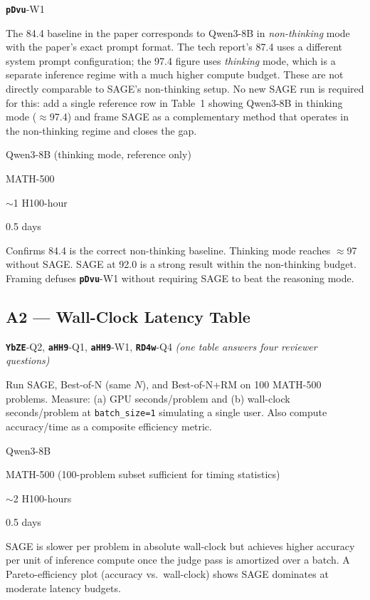 \documentclass[11pt,a4paper]{article}
\newcommand{\rev}[1]{\texttt{\textbf{#1}}}
\begin{document}
\begin{description}[leftmargin=2cm, style=nextline]
  \item[Covers] \rev{pDvu}-W1
  \item[Rationale] The 84.4 baseline in the paper corresponds to Qwen3-8B in \emph{non-thinking}
    mode with the paper's exact prompt format. The tech report's 87.4 uses a different system
    prompt configuration; the 97.4 figure uses \emph{thinking} mode, which is a separate inference
    regime with a much higher compute budget. These are not directly comparable to SAGE's
    non-thinking setup. No new SAGE run is required for this: add a single reference row in
    Table~1 showing Qwen3-8B in thinking mode ($\approx$97.4) and frame SAGE as a
    complementary method that operates in the non-thinking regime and closes the gap.
  \item[Model] Qwen3-8B (thinking mode, reference only)
  \item[Benchmark] MATH-500
  \item[GPU estimate] $\sim$1 H100-hour
  \item[Wall-clock] 0.5 days
  \item[Expected outcome] Confirms 84.4 is the correct non-thinking baseline. Thinking mode
    reaches $\approx$97 without SAGE. SAGE at 92.0 is a strong result within the non-thinking
    budget. Framing defuses \rev{pDvu}-W1 without requiring SAGE to beat the reasoning mode.
\end{description}

\subsection*{A2 --- Wall-Clock Latency Table}

\begin{description}[leftmargin=2cm, style=nextline]
  \item[Covers] \rev{YbZE}-Q2, \rev{aHH9}-Q1, \rev{aHH9}-W1, \rev{RD4w}-Q4
    \emph{(one table answers four reviewer questions)}
  \item[Procedure] Run SAGE, Best-of-N (same $N$), and Best-of-N+RM on 100 MATH-500 problems.
    Measure: (a) GPU seconds/problem and (b) wall-clock seconds/problem at \texttt{batch\_size=1}
    simulating a single user. Also compute accuracy/time as a composite efficiency metric.
  \item[Model] Qwen3-8B
  \item[Benchmark] MATH-500 (100-problem subset sufficient for timing statistics)
  \item[GPU estimate] $\sim$2 H100-hours
  \item[Wall-clock] 0.5 days
  \item[Expected outcome] SAGE is slower per problem in absolute wall-clock but achieves higher
    accuracy per unit of inference compute once the judge pass is amortized over a batch.
    A Pareto-efficiency plot (accuracy vs.\ wall-clock) shows SAGE dominates at moderate latency
    budgets.
\end{description}
\end{document}
